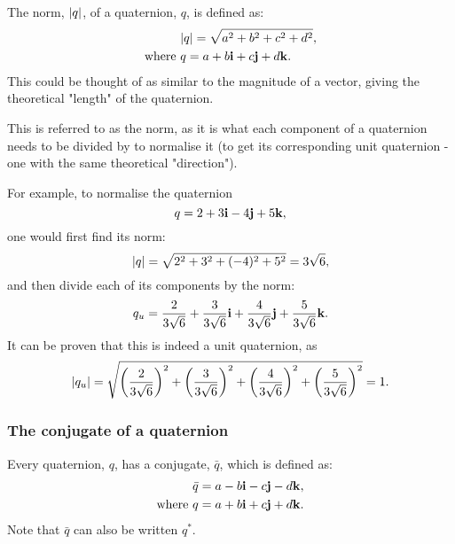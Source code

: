 \documentclass[10pt]{article}
\begin{document}
The norm, $\abs{q}$, of a quaternion, $q$, is defined as:
\begin{equation}
    \begin{aligned}
        &\abs{q} = \sqrt{a^2 + b^2 + c^2 + d^2}, \\
        \text{where } & q = a + b\vb{i} + c\vb{j} + d\vb{k}.
    \end{aligned} 
\end{equation}
This could be thought of as similar to the magnitude of a vector, giving the theoretical "length" of the quaternion. \cite{Math431}

This is referred to as the norm, as it is what each component of a quaternion needs to be divided by to normalise it (to get its corresponding unit quaternion - one with the same theoretical "direction").

For example, to normalise the quaternion
\begin{equation}
    q = 2 + 3\vb{i} - 4\vb{j} + 5\vb{k},
\end{equation}
one would first find its norm:
\begin{equation}
    \abs{q} = \sqrt{2^2 + 3^2 + (-4)^2 + 5^2} = 3\sqrt{6},
\end{equation}
and then divide each of its components by the norm:
\begin{equation}
    q_u = \frac{2}{3\sqrt{6}}+\frac{3}{3\sqrt{6}}\vb{i}+\frac{4}{3\sqrt{6}}\vb{j}+\frac{5}{3\sqrt{6}}\vb{k}.
\end{equation}
It can be proven that this is indeed a unit quaternion, as
\begin{equation}
    \abs{q_u} = \sqrt{\left(\frac{2}{3\sqrt{6}}\right)^2+\left(\frac{3}{3\sqrt{6}}\right)^2+\left(\frac{4}{3\sqrt{6}}\right)^2+\left(\frac{5}{3\sqrt{6}}\right)^2} = 1.
\end{equation}

\subsubsection{The conjugate of a quaternion}

Every quaternion, $q$, has a conjugate, $\bar{q}$, which is defined as:
\begin{equation}
    \begin{aligned}
        &\bar{q} = a - b\vb{i} - c\vb{j} - d\vb{k}, \\
        \text{where } & q = a + b\vb{i} + c\vb{j} + d\vb{k}.
    \end{aligned}
\end{equation}
Note that $\bar{q}$ can also be written $q^*$. \cite{DRose}
\end{document}
